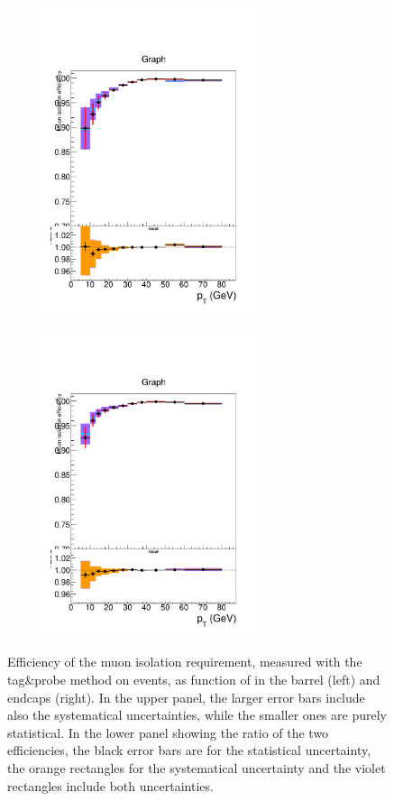 \begin{figure}[tbh]
\centering
\begin{subfigure}{0.45\textwidth}
\centering
\includegraphics[width=2.5in]{Figures/Muons/mu_iso_barrel.pdf}
\caption{}
\end{subfigure}
\begin{subfigure}{0.45\textwidth}
\centering
\includegraphics[width=2.5in]{Figures/Muons/mu_iso_endcap.pdf}
\caption{}
\end{subfigure}
    \caption{Efficiency of the muon isolation requirement, measured with the tag\&probe method on \Z events, as function of \pt in the barrel (left) and endcaps (right). In the upper panel, the larger error bars include also the systematical uncertainties, while the smaller ones are purely statistical. In the lower panel showing the ratio of the two efficiencies, the black error bars are for the statistical uncertainty, the orange rectangles for the systematical uncertainty and the violet rectangles include both uncertainties.}
\label{fig:MuonIDEff_3}
\end{figure}

